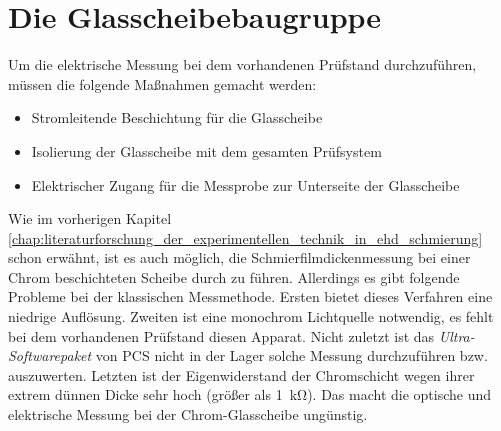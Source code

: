 \section{Die Glasscheibebaugruppe}
\label{sec:die_glasscheibebaugruppe}

Um die elektrische Messung bei dem vorhandenen Prüfstand durchzuführen, müssen die folgende Maßnahmen gemacht werden:
\begin{itemize}
    \item Stromleitende Beschichtung für die Glasscheibe
    \item Isolierung der Glasscheibe mit dem gesamten Prüfsystem
    \item Elektrischer Zugang für die Messprobe zur Unterseite der Glasscheibe
\end{itemize}

Wie im vorherigen Kapitel \ref{chap:literaturforschung_der_experimentellen_technik_in_ehd_schmierung} schon erwähnt, ist es auch möglich, die Schmierfilmdickenmessung bei einer Chrom beschichteten Scheibe durch zu führen.
Allerdings es gibt folgende Probleme bei der klassischen Messmethode.
Ersten bietet dieses Verfahren eine niedrige Auflösung. Zweiten ist eine monochrom Lichtquelle notwendig, es fehlt bei dem vorhandenen Prüfstand diesen Apparat.
Nicht zuletzt ist das \textit{Ultra-Softwarepaket} von PCS nicht in der Lager solche Messung durchzuführen bzw. auszuwerten.
Letzten ist der Eigenwiderstand der Chromschicht wegen ihrer extrem dünnen Dicke sehr hoch (größer als \SI{1}{\kilo\ohm}).
Das macht die optische und elektrische Messung bei der Chrom-Glasscheibe ungünstig.

